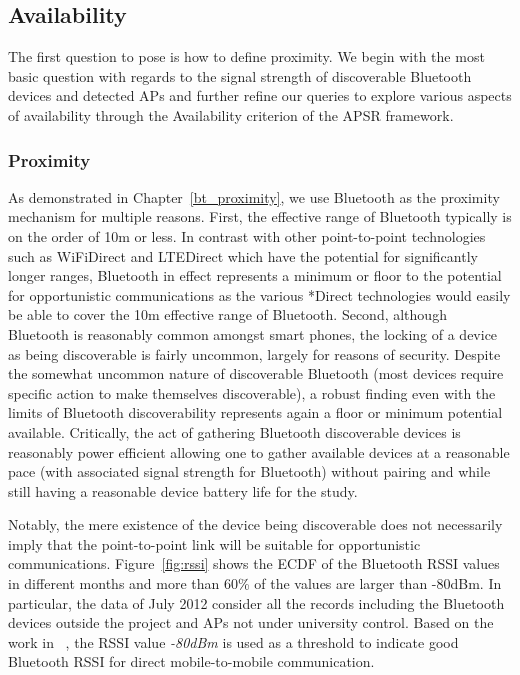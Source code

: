\subsection{Availability}
The first question to pose is how to define proximity. We begin with the most basic question with regards to the signal strength of discoverable Bluetooth devices and detected APs and further refine our queries to explore various aspects of availability through the Availability criterion of the APSR framework. 

\subsubsection{Proximity}
As demonstrated in Chapter~\ref{bt_proximity}, we use Bluetooth as the proximity mechanism for multiple reasons.  First, the effective range of Bluetooth typically is on the order of 10m or less.  In contrast with other point-to-point technologies such as WiFiDirect and LTEDirect which have the potential for significantly longer ranges, Bluetooth in effect represents a minimum or floor to the potential for opportunistic communications as the various *Direct technologies would easily be able to cover the 10m effective range of Bluetooth.  Second, although Bluetooth is reasonably common amongst smart phones, the locking of a device as being discoverable is fairly uncommon, largely for reasons of security.  Despite the somewhat uncommon nature of discoverable Bluetooth (most devices require specific action to make themselves discoverable), a robust finding even with the limits of Bluetooth discoverability represents again a floor or minimum potential available.  Critically, the act of gathering Bluetooth discoverable devices is reasonably power efficient allowing one to gather available devices at a reasonable pace (with associated signal strength for Bluetooth) without pairing and while still having a reasonable device battery life for the study. 

Notably, the mere existence of the device being discoverable does not necessarily imply that the point-to-point link will be suitable for opportunistic communications.  Figure~\ref{fig:rssi} shows the ECDF of the Bluetooth RSSI values in different months and more than 60\% of the values are larger than -80dBm.  In particular, the data of July 2012 consider all the records including the Bluetooth devices outside the project and APs not under university control. Based on the work in ~\cite{polastre2005telos}, the RSSI value \emph{-80dBm} is used as a threshold to indicate good Bluetooth RSSI for direct mobile-to-mobile communication.  

